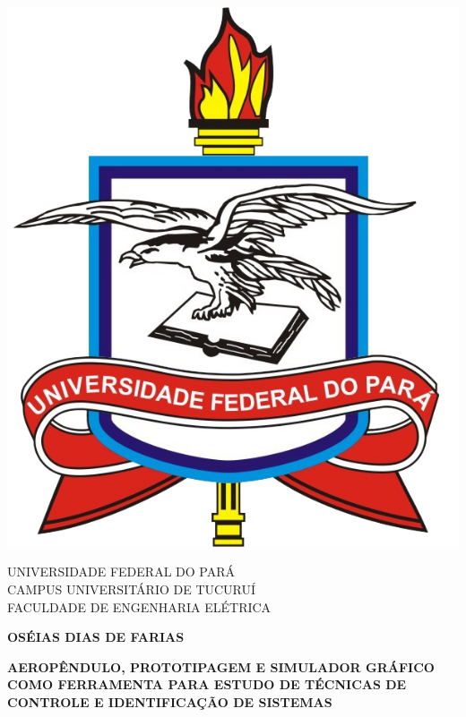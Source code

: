 	\newpage
	\thispagestyle{empty}
		\newpage
		\setcounter{page}{2}
		\newpage
		\thispagestyle{empty}
		\begin{center}
  
            \includegraphics[scale=0.5]{Figuras/logoufpa.png}
            
			UNIVERSIDADE FEDERAL DO PARÁ\\
			CAMPUS UNIVERSITÁRIO DE TUCURUÍ\\
			FACULDADE DE ENGENHARIA ELÉTRICA
			
			\vspace{7mm}
			
			\vfill
			
			\textbf{OSÉIAS DIAS DE FARIAS}
			
			\vfill
			
			\vspace{10mm}
			
			\textbf{AEROPÊNDULO, PROTOTIPAGEM E SIMULADOR GRÁFICO COMO FERRAMENTA PARA ESTUDO DE TÉCNICAS DE CONTROLE E IDENTIFICAÇÃO DE SISTEMAS}
						

\end{center}
